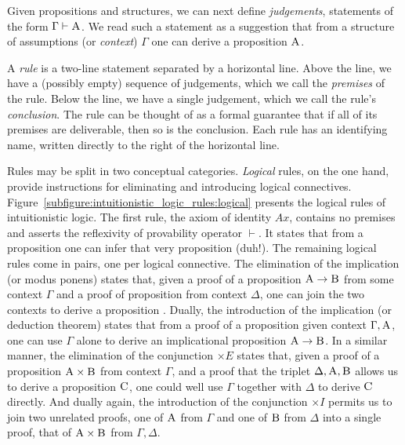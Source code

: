 Given propositions and structures, we can next define \textit{judgements}, statements of the form
$\Gamma \vdash \prop{A}$.
We read such a statement as a suggestion that from a structure of assumptions (or \textit{context}) $\Gamma$ one can derive a proposition $\prop{A}$.

A \textit{rule} is a two-line statement separated by a horizontal line.
Above the line, we have a (possibly empty) sequence of judgements, which we call the \textit{premises} of the rule.
Below the line, we have a single judgement, which we call the rule's \textit{conclusion}.
The rule can be thought of as a formal guarantee that if all of its premises are deliverable, then so is the conclusion.
Each rule has an identifying name, written directly to the right of the horizontal line.

Rules may be split in two conceptual categories.
\textit{Logical} rules, on the one hand, provide instructions for eliminating and introducing logical connectives.
Figure~\ref{subfigure:intuitionistic_logic_rules:logical} presents the logical rules of intuitionistic logic.
The first rule, the axiom of identity $Ax$, contains no premises and asserts the reflexivity of provability operator $\vdash$. 
It states that from a proposition  one can infer that very proposition (duh!).
The remaining logical rules come in pairs, one per logical connective.
The elimination of the implication (or modus ponens) states that, given a proof of a proposition $\prop A \to \prop B$ from some context $\Gamma$ and a proof of proposition  from context $\Delta$, one can join the two contexts to derive a proposition .
Dually, the introduction of the implication (or deduction theorem) states that from a proof of a proposition  given context $\Gamma, \prop{A}$, one can use $\Gamma$ alone to derive an implicational proposition $\prop A \to \prop B$.
In a similar manner, the elimination of the conjunction $\times E $ states that, given a proof of a proposition $\prop A \times \prop B$ from context $\Gamma$, and a proof that the triplet $\Delta, \prop A, \prop B$ allows us to derive a proposition $\prop C$, one could well use $\Gamma$ together with $\Delta$ to derive $\prop C$ directly.
And dually again, the introduction of the conjunction $\times I$ permits us to join two unrelated proofs, one of $\prop A$ from $\Gamma$ and one of $\prop B$ from $\Delta$ into a single proof, that of $\prop A \times \prop B$ from $\Gamma, \Delta$.

